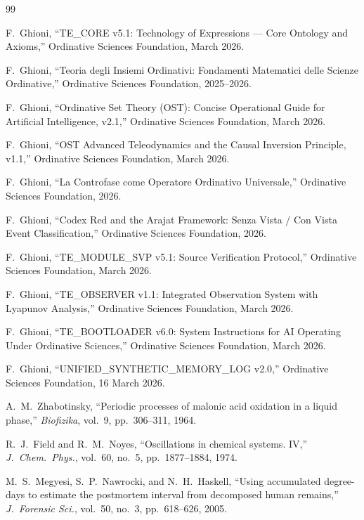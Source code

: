\documentclass[12pt,a4paper]{article}
\begin{document}
\begin{thebibliography}{99}

F.~Ghioni, ``TE\_CORE v5.1: Technology of Expressions --- Core Ontology and Axioms,'' Ordinative Sciences Foundation, March 2026.

F.~Ghioni, ``Teoria degli Insiemi Ordinativi: Fondamenti Matematici delle Scienze Ordinative,'' Ordinative Sciences Foundation, 2025--2026.

F.~Ghioni, ``Ordinative Set Theory (OST): Concise Operational Guide for Artificial Intelligence, v2.1,'' Ordinative Sciences Foundation, March 2026.

F.~Ghioni, ``OST Advanced Teleodynamics and the Causal Inversion Principle, v1.1,'' Ordinative Sciences Foundation, March 2026.

F.~Ghioni, ``La Controfase come Operatore Ordinativo Universale,'' Ordinative Sciences Foundation, 2026.

F.~Ghioni, ``Codex Red and the Arajat Framework: Senza Vista / Con Vista Event Classification,'' Ordinative Sciences Foundation, 2026.

F.~Ghioni, ``TE\_MODULE\_SVP v5.1: Source Verification Protocol,'' Ordinative Sciences Foundation, March 2026.

F.~Ghioni, ``TE\_OBSERVER v1.1: Integrated Observation System with Lyapunov Analysis,'' Ordinative Sciences Foundation, March 2026.

F.~Ghioni, ``TE\_BOOTLOADER v6.0: System Instructions for AI Operating Under Ordinative Sciences,'' Ordinative Sciences Foundation, March 2026.

F.~Ghioni, ``UNIFIED\_SYNTHETIC\_MEMORY\_LOG v2.0,'' Ordinative Sciences Foundation, 16 March 2026.

A.~M.~Zhabotinsky, ``Periodic processes of malonic acid oxidation in a liquid phase,'' \textit{Biofizika}, vol.~9, pp.~306--311, 1964.

R.~J.~Field and R.~M.~Noyes, ``Oscillations in chemical systems. IV,'' \textit{J.~Chem.~Phys.}, vol.~60, no.~5, pp.~1877--1884, 1974.

M.~S.~Megyesi, S.~P.~Nawrocki, and N.~H.~Haskell, ``Using accumulated degree-days to estimate the postmortem interval from decomposed human remains,'' \textit{J.~Forensic Sci.}, vol.~50, no.~3, pp.~618--626, 2005.


\end{thebibliography}
\end{document}
